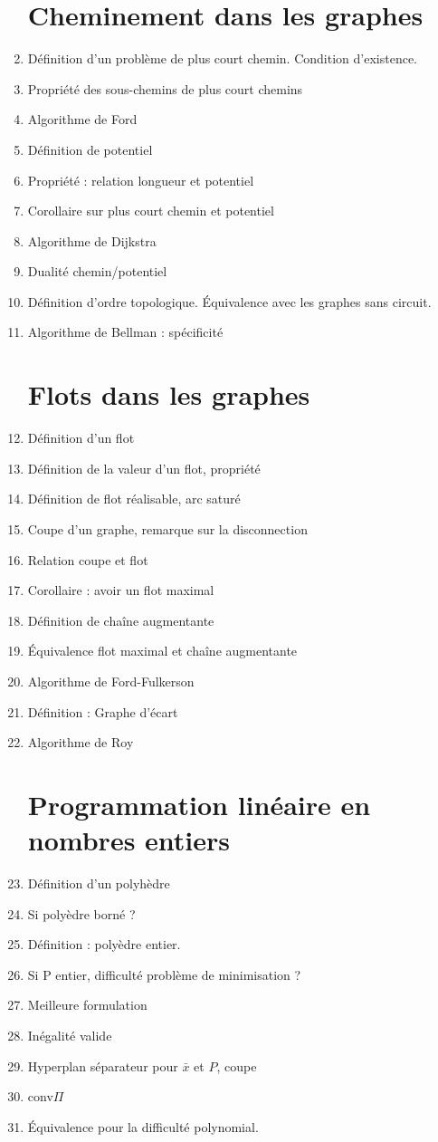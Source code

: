 \documentclass[11pt, twocolumn, landscape]{article}
\begin{document}
\begin{enumerate}
\section{Cheminement dans les graphes}
	\item Définition d'un problème de plus court chemin. Condition d'existence.
	\item Propriété des sous-chemins de plus court chemins
	\item Algorithme de Ford
	\item Définition de potentiel
	\item Propriété : relation longueur et potentiel
	\item Corollaire sur plus court chemin et potentiel
	\item Algorithme de Dijkstra
	\item Dualité chemin/potentiel
	\item Définition d'ordre topologique. Équivalence avec les graphes sans circuit.
	\item Algorithme de Bellman : spécificité
\section{Flots dans les graphes}
	\item Définition d'un flot
	\item Définition de la valeur d'un flot, propriété
	\item Définition de flot réalisable, arc saturé
	\item Coupe d'un graphe, remarque sur la disconnection
	\item Relation coupe et flot
	\item Corollaire : avoir un flot maximal
	\item Définition de chaîne augmentante
	\item Équivalence flot maximal et chaîne augmentante
	\item Algorithme de Ford-Fulkerson
	\item Définition : Graphe d'écart
	\item Algorithme de Roy
\section{Programmation linéaire en nombres entiers}
	\item Définition d'un polyhèdre
	\item Si polyèdre borné ?
	\item Définition : polyèdre entier.
	\item Si P entier, difficulté problème de minimisation ?
	\item Meilleure formulation
	\item Inégalité valide
	\item Hyperplan séparateur pour $\bar{x}$ et $P$, coupe
	\item conv$\Pi$
	\item Équivalence pour la difficulté polynomial.
\end{enumerate}
\end{document}
